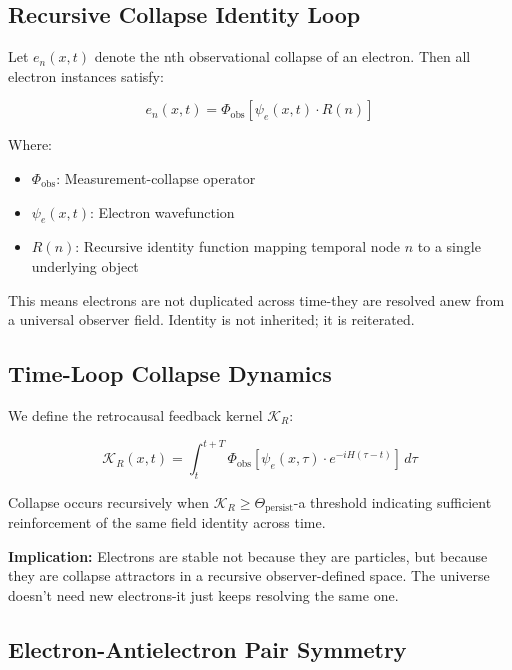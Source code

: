 \subsection{Recursive Collapse Identity Loop}

Let \( e_n(x,t) \) denote the nth observational collapse of an electron. Then all electron instances satisfy:

\begin{equation}
e_n(x,t) = \Phi_{\text{obs}} \left[ \psi_e(x,t) \cdot R(n) \right]
\end{equation}

Where:
\begin{itemize}
    \item \( \Phi_{\text{obs}} \): Measurement-collapse operator
    \item \( \psi_e(x,t) \): Electron wavefunction
    \item \( R(n) \): Recursive identity function mapping temporal node \( n \) to a single underlying object
\end{itemize}

This means electrons are not duplicated across time-they are resolved anew from a universal observer field. Identity is not inherited; it is reiterated.

\subsection{Time-Loop Collapse Dynamics}

We define the retrocausal feedback kernel \( \mathcal{K}_R \):

\begin{equation}
\mathcal{K}_R(x,t) = \int_{t}^{t + T} \Phi_{\text{obs}} \left[ \psi_e(x,\tau) \cdot e^{-iH(\tau - t)} \right] \, d\tau
\end{equation}

Collapse occurs recursively when \( \mathcal{K}_R \geq \Theta_{\text{persist}} \)-a threshold indicating sufficient reinforcement of the same field identity across time.

\textbf{Implication:} Electrons are stable not because they are particles, but because they are collapse attractors in a recursive observer-defined space. The universe doesn’t need new electrons-it just keeps resolving the same one.

\subsection{Electron-Antielectron Pair Symmetry}

